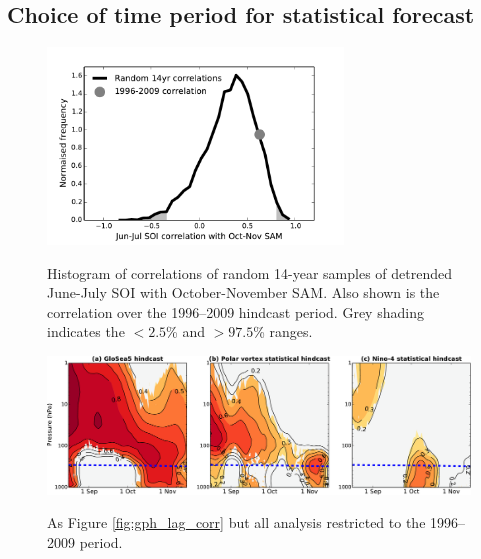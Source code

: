 \begin{subappendices}
\section{Choice of time period for statistical forecast}

\begin{figure}[t]
  \noindent\includegraphics[width=0.7\textwidth,angle=0]{figures/chapter-seasonal/SAM_SOI_corr.pdf}\\
  \caption[Correlation of the SOI with the SAM.]{Histogram of correlations of
    random 14-year samples of detrended June-July SOI with October-November
    SAM. Also shown is the correlation over the 1996--2009 hindcast period. Grey
  shading indicates the $<2.5$\% and $>97.5$\% ranges.}\label{fig:sam_soi_corr}
\end{figure}

\begin{figure}[t]
  \noindent\includegraphics[width=\textwidth,angle=0]{figures/chapter-seasonal/lag_height_short.pdf}\\
  \caption[Lag-height correlation of GloSea5 polar cap geopotential height]{As
    Figure \ref{fig:gph_lag_corr} but all analysis restricted to the 1996--2009
    period.}\label{fig:lag_height_short}
\end{figure}

\end{subappendices}


